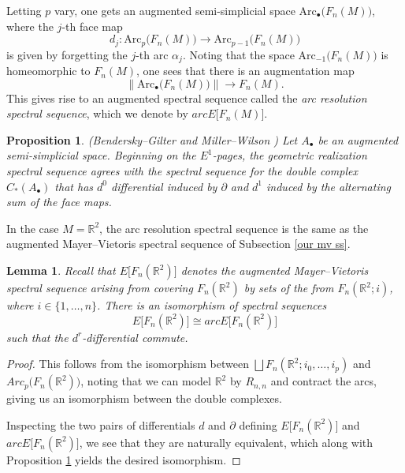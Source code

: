 \documentclass[pagebackref,colorlinks,citecolor=blue,linkcolor=blue,urlcolor=blue,filecolor=blue]{article}
\newtheorem{lem}[thm]{Lemma}
\newtheorem{prop}[thm]{Proposition}
\theoremstyle{definition}\newtheorem{definition}[thm]{Definition}
\theoremstyle{definition}
\newcommand{\R}{\ensuremath{\mathbb{R}}}
\begin{document}
Letting $p$ vary, one gets an augmented semi-simplicial space $\text{Arc}_{\bullet}\big(F_{n}(M)\big)$, where the $j$-th face map
\[
d_{j}:\text{Arc}_{p}\big(F_{n}(M)\big)\to \text{Arc}_{p-1}\big(F_{n}(M)\big)
\]
is given by forgetting the $j$-th arc $\alpha_{j}$.
Noting that the space $\text{Arc}_{-1}\big(F_{n}(M)\big)$ is homeomorphic to $F_{n}(M)$, one sees that there is an augmentation map
\[
\big\|\text{Arc}_{\bullet}\big(F_{n}(M)\big)\big\|\to F_{n}(M).
\]
This gives rise to an augmented spectral sequence called the \emph{arc resolution spectral sequence}, which we denote by $arcE\big[F_{n}(M)\big]$.

\begin{prop}\label{differential definition of arc}
(Bendersky--Gilter \cite[Prop 1.2]{bendersky1991cohomology} and Miller--Wilson \cite[Prop 3.13]{miller2019higher})
Let $A_{\bullet}$ be an augmented semi-simplicial space.
Beginning on the $E^{1}$-pages, the geometric realization spectral sequence agrees with the spectral sequence for the double complex $C_{*}(A_{\bullet})$ that has $d^{0}$ differential induced by $\partial$ and $d^{1}$ induced by the alternating sum of the face maps.
\end{prop}

In the case $M=\R^{2}$, the arc resolution spectral sequence is the same as the augmented Mayer--Vietoris spectral sequence of Subsection \ref{our mv ss}.

\begin{lem}\label{MV is Arc}
Recall that $E\big[F_{n}(\R^{2})\big]$ denotes the augmented Mayer--Vietoris spectral sequence arising from covering $F_{n}(\R^{2})$ by sets of the from $F_{n}(\R^{2};i)$, where $i\in \{1,\dots, n\}$.
There is an isomorphism of spectral sequences
\[
E\big[F_{n}(\R^{2})\big]\cong arcE\big[F_{n}(\R^{2})\big]
\]
such that the $d^{r}$-differential commute.
\end{lem}

\begin{proof}
This follows from the isomorphism between $\bigsqcup F_{n}(\R^{2}; i_{0}, \dots, i_{p})$ and $Arc_{p}\big(F_{n}(\R^{2})\big)$, noting that we can model $\R^{2}$ by $R_{n,n}$ and contract the arcs, giving us an isomorphism between the double complexes.

Inspecting the two pairs of differentials $d$ and $\partial$ defining $E\big[F_{n}(\R^{2})\big]$ and $arcE\big[F_{n}(\R^{2})\big]$, we see that they are naturally equivalent, which along with Proposition \ref{differential definition of arc} yields the desired isomorphism.
\end{proof}
\end{document}
